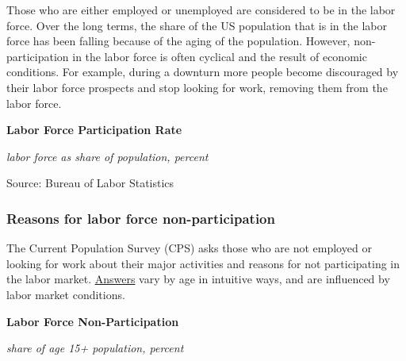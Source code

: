 \documentclass{report}
\makeatletter
\newcommand{\tbllink}[1]{\href{https://raw.githubusercontent.com/bdecon/US-chartbook/master/chartbook/data/#1}{\faTable}}
\newcommand*\short[1]{\expandafter\@gobbletwo\number\numexpr#1\relax}
\newcommand{\dateaxisticks}{
		date coordinates in=x, axis line style={draw=none},
		xmax={2020-10-01},
		max space between ticks=40,	    
		xtick={{1990-01-01}, {1992-01-01}, {1994-01-01}, 
			{1996-01-01}, {1998-01-01}, {2000-01-01}, 
			{2002-01-01}, {2004-01-01}, {2006-01-01},
			{2008-01-01}, {2010-01-01}, {2012-01-01}, {2014-01-01},
		    {2016-01-01}, {2018-01-01}, {2020-01-01}},
		minor xtick={{1989-01-01}, {1991-01-01}, {1993-01-01},
			{1995-01-01}, {1997-01-01}, {1999-01-01}, 
			{2001-01-01}, {2003-01-01}, {2005-01-01}, {2007-01-01},
		    {2009-01-01}, {2011-01-01}, {2013-01-01}, {2015-01-01},
		    {2017-01-01}, {2019-01-01}},
		enlarge y limits={0.06}, enlarge x limits={0.01},
		}
\newcommand{\bbar}[2]{extra #1 ticks = {{#2}}, extra #1 tick labels = ,
		extra #1 tick style = {grid=major, grid style={thick, black!25}},}
\newcommand{\stdline}[4]{\addplot[very thick, no markers, color=#1] 
		table [x=#2, y=#3, col sep=comma] {#4};	}
\newcommand{\rbars}{
		\fill[color=black!10] (axis cs:{1990-07-01},\pgfkeysvalueof{/pgfplots/ymin}) rectangle 
			(axis cs:{1991-03-01}, \pgfkeysvalueof{/pgfplots/ymax});
		\fill[color=black!10] (axis cs:{2007-12-01},\pgfkeysvalueof{/pgfplots/ymin}) rectangle 
			(axis cs:{2009-07-01}, \pgfkeysvalueof{/pgfplots/ymax});
		\fill[color=black!10] (axis cs:{2001-03-01},\pgfkeysvalueof{/pgfplots/ymin}) rectangle 
			(axis cs:{2001-11-01}, \pgfkeysvalueof{/pgfplots/ymax});
		\fill[color=black!10] (axis cs:{2020-02-01},\pgfkeysvalueof{/pgfplots/ymin}) rectangle 
			(axis cs:{2020-10-01}, \pgfkeysvalueof{/pgfplots/ymax});}
\makeatother
\begin{document}
{{{{{{{{{\begin{minipage}{0.76\textwidth}
\small Those who are either employed or unemployed are considered to be in the labor force. Over the long terms, the share of the US population that is in the labor force has been falling because of the aging of the population. However, non-participation in the labor force is often cyclical and the result of economic conditions. For example, during a downturn more people become discouraged by their labor force prospects and stop looking for work, removing them from the labor force.\\



\vspace{3mm}

\normalsize \textbf{Labor Force Participation Rate}

\footnotesize{\textit{labor force as share of population, percent}}

\hspace*{-2mm} 

\footnotesize{Source: Bureau of Labor Statistics} \hfill \tbllink{lfpr.csv}
\end{minipage}
\newpage
\subsubsection*{\color{black!70} \seriffont Reasons for labor force non-participation}
\begin{minipage}{0.76\textwidth}
\small The Current Population Survey (CPS) asks those who are not employed or looking for work about their major activities and reasons for not participating in the labor market. \href{https://www.frbatlanta.org/chcs/human-capital-currents/2015/0612-measuring-labor-market-status-using-basic-data.aspx}{Answers} vary by age in intuitive ways, and are influenced by labor market conditions. 
\end{minipage}

\begin{minipage}{0.38\textwidth}
\normalsize \textbf{Labor Force Non-Participation}

\footnotesize{\textit{share of age 15+ population, percent}}


\end{minipage}}}}}}}}}}
\end{document}
